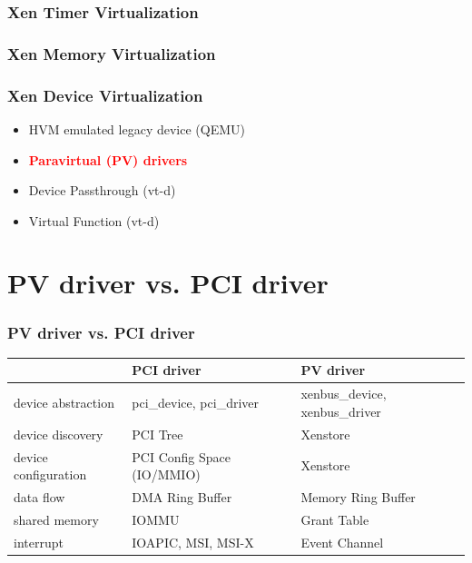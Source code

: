 \documentclass[aspectratio=169]{beamer}
\begin{document}

\begin{frame}
\frametitle{Xen Timer Virtualization}
\end{frame}


\begin{frame}
\frametitle{Xen Memory Virtualization}
\end{frame}


\begin{frame}
\frametitle{Xen Device Virtualization}
\begin{itemize}
\item HVM emulated legacy device (QEMU) \pause
\item \textbf<5->{\textcolor<5->{red}{Paravirtual (PV) drivers}} \pause
\item Device Passthrough (vt-d) \pause
\item Virtual Function (vt-d) \pause
\end{itemize}
\end{frame}


\section{PV driver vs. PCI driver}
\begin{frame}
\frametitle{PV driver vs. PCI driver}
\begin{table}
\small
\begin{tabular}{l l l}
\toprule
& \textbf{PCI driver} & \textbf{PV driver}\\
\midrule
device abstraction & pci\_device, pci\_driver & xenbus\_device, xenbus\_driver \\
device discovery & PCI Tree & Xenstore \\
device configuration & PCI Config Space (IO/MMIO) & Xenstore \\
data flow & DMA Ring Buffer & Memory Ring Buffer \\
shared memory & IOMMU & Grant Table \\
interrupt & IOAPIC, MSI, MSI-X & Event Channel \\
\bottomrule
\end{tabular}
\end{table}
\end{frame}
\end{document}
